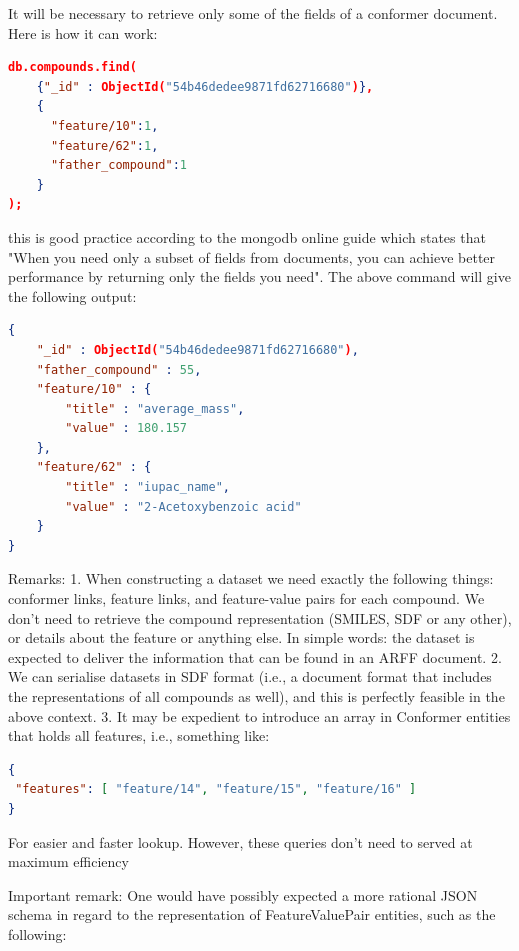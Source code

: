 It will be necessary to retrieve only some of the fields of a conformer document. Here is how it can work:

\begin{lstlisting}[language=json]
db.compounds.find(
    {"_id" : ObjectId("54b46dedee9871fd62716680")},
    {
      "feature/10":1, 
      "feature/62":1,
      "father_compound":1
    }
);
\end{lstlisting}

this is good practice according to the mongodb online guide which states that "When you need only a subset of fields from documents, you can achieve better performance by returning only the fields you need". The above command will give the following output:
\begin{lstlisting}[language=json]
{
	"_id" : ObjectId("54b46dedee9871fd62716680"),
	"father_compound" : 55,
	"feature/10" : {
		"title" : "average_mass",
		"value" : 180.157
	},
	"feature/62" : {
		"title" : "iupac_name",
		"value" : "2-Acetoxybenzoic acid"
	}
}
\end{lstlisting}

Remarks: 
1. When constructing a dataset we need exactly the following things: conformer links, feature links, and feature-value pairs for each compound. We don’t  need to retrieve the compound representation (SMILES, SDF or any other), or details about the feature or anything else. In simple words: the dataset is expected to deliver the information that can be found in an ARFF document. 
2. We can serialise datasets in SDF format (i.e., a document format that includes the representations of all compounds as well), and this is perfectly feasible in the above context.
3. It may be expedient to introduce an array in Conformer entities that holds all features, i.e., something like:
\begin{lstlisting}[language=json]
{
 "features": [ "feature/14", "feature/15", "feature/16" ] 
}
\end{lstlisting}
For easier and faster lookup. However, these queries don't need to served at maximum efficiency

Important remark: One would have possibly expected a more rational JSON schema in regard to the representation of FeatureValuePair entities, such as the following:

